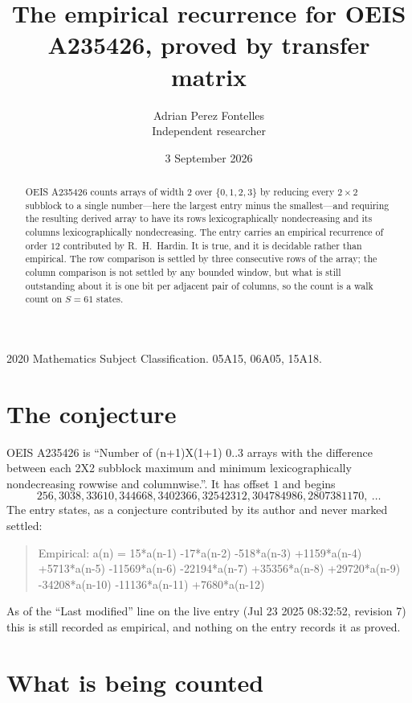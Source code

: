 \documentclass[11pt,a4paper]{article}
\title{The empirical recurrence for OEIS A235426, proved by transfer matrix}
\author{Adrian Perez Fontelles\\ \small Independent researcher}
\date{3 September 2026}
\theoremstyle{plain}
\theoremstyle{definition}
\begin{document}
\maketitle

\begin{abstract}
OEIS A235426 counts arrays of width $2$ over $\{0,1,2,3\}$ by reducing every $2\times2$ subblock to a
single number---here the largest entry minus the smallest---and requiring the resulting derived array to have its rows
lexicographically nondecreasing and its columns lexicographically nondecreasing. The entry carries an
empirical recurrence of order $12$ contributed by R.~H.~Hardin. It is true, and it is
decidable rather than empirical. The row comparison is settled by three consecutive rows of the
array; the column comparison is not settled by any bounded window, but what is still outstanding
about it is one bit per adjacent pair of columns, so the count is a walk count on $S=61$
states.
\end{abstract}

\noindent\small 2020 Mathematics Subject Classification. 05A15, 06A05, 15A18.\normalsize

\section{The conjecture}

OEIS A235426 is ``Number of (n+1)X(1+1) 0..3 arrays with the difference between each 2X2 subblock maximum and minimum lexicographically nondecreasing rowwise and columnwise.''. It has offset $1$ and begins
\[
256, 3038, 33610, 344668, 3402366, 32542312, 304784986, 2807381170,\ \dots
\]
The entry states, as a conjecture contributed by its author and never marked settled:
\begin{quote}
Empirical: a(n) = 15*a(n-1) -17*a(n-2) -518*a(n-3) +1159*a(n-4) +5713*a(n-5) -11569*a(n-6) -22194*a(n-7) +35356*a(n-8) +29720*a(n-9) -34208*a(n-10) -11136*a(n-11) +7680*a(n-12)
\end{quote}
As of the ``Last modified'' line on the live entry (Jul 23 2025 08:32:52, revision 7) this is still
recorded as empirical, and nothing on the entry records it as proved.

\section{What is being counted}
\end{document}
